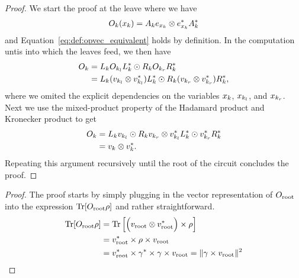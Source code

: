 \begin{proof}
	We start the proof at the leave where we have
	\begin{align}
		O_k(x_k)
		=
		A_k e_{x_k} \otimes  e_{x_k}^* A_k^*
	\end{align}
	and Equation~\ref{eq:def:opvec_equivalent} holds by definition. In the computation untis into which the leaves feed, we then have
	\begin{align}
		O_k
		 & = L_k O_{k_l} L_k^* \odot R_k O_{k_r} R_k^*
		\nonumber
		\\
		 & = L_k (v_{k_l} \otimes v^*_{k_l} ) L_k^*
		\odot
		R_k (v_{k_r} \otimes v^*_{k_r} ) R_k^*,
	\end{align}
	where we omited the explicit dependencies on the variables $x_k$, $x_{k_l}$, and $x_{k_r}$. Next we use the mixed-product property of the Hadamard product and Kronecker product to get
	\begin{align}
		O_k
		 & =
		L_k v_{k_l} \odot  R_k v_{k_r}
		\otimes
		v^*_{k_l} L_k^* \odot v^*_{k_r} R_k^*
		\nonumber
		\\
		 & = v_k \otimes v_k^*.
	\end{align}
	Repeating this argument recursively until the root of the circuit concludes the proof.
\end{proof}






\propvoequiprob*


\begin{proof}
	The proof starts by simply plugging in the vector representation of $O_{\text{root}}$ into the expression $\Tr [O_{\text{root}} \rho]$ and rather straightforward.
	\begin{align}
		\Tr [O_{\text{root}} \rho]
		 &
		=
		\Tr \left[
			\Bigl(v_{\text{root}} \otimes v^*_{\text{root}}   \Bigr) \times \rho
			\right]
		\\
		 & = v^*_{\text{root}} \times  \rho \times v_{\text{root}}
		\nonumber
		\\
		 & = v^*_{\text{root}} \times  \gamma^* \times \gamma \times v_{\text{root}}
		\nonumber
		= \lVert \gamma \times v_{\text{root}}\rVert^2
	\end{align}

\end{proof}





